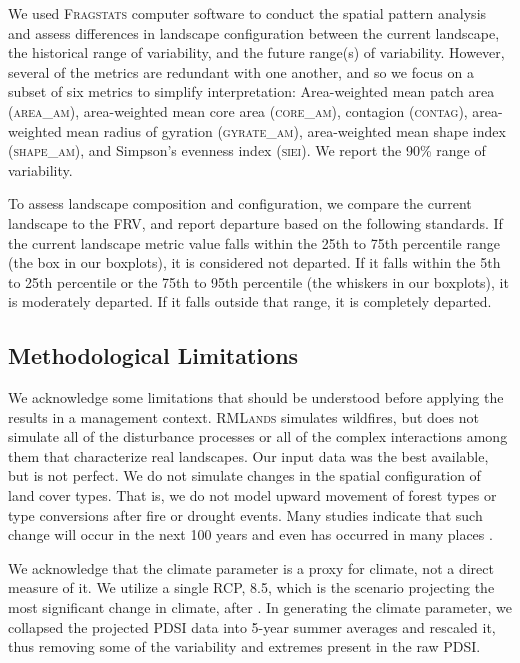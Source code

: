 \documentclass[12pt]{article}
\begin{document}
\begin{spacing}{1}
%
We used \textsc{Fragstats} computer software \citep{Fragstats2012} to conduct the spatial pattern analysis and assess differences in landscape configuration between the current landscape, the historical range of variability, and the future range(s) of variability. However, several of the metrics are redundant with one another, and so we focus on a subset of six metrics to simplify interpretation: Area-weighted mean patch area (\textsc{area\_am}), area-weighted mean core area (\textsc{core\_am}), contagion (\textsc{contag}), area-weighted mean radius of gyration (\textsc{gyrate\_am}), area-weighted mean shape index (\textsc{shape\_am}), and Simpson's evenness index (\textsc{siei}). We report the 90\% range of variability. %

To assess landscape composition and configuration, we compare the current landscape to the FRV, and report departure based on the following standards. If the current landscape metric value falls within the 25th to 75th percentile range (the box in our boxplots), it is considered not departed. If it falls within the 5th to 25th percentile or the 75th to 95th percentile (the whiskers in our boxplots), it is moderately departed. If it falls outside that range, it is completely departed.



\subsection*{Methodological Limitations}
We acknowledge some limitations that should be understood before applying the results in a management context. \textsc{RMLands} simulates wildfires, but does not simulate all of the disturbance processes or all of the complex interactions among them that characterize real landscapes. Our input data was the best available, but is not perfect. We do not simulate changes in the spatial configuration of land cover types. That is, we do not model upward movement of forest types or type conversions after fire or drought events. Many studies indicate that such change will occur in the next 100 years and even has occurred in many places \citep{Bachelet2001}. 

We acknowledge that the climate parameter is a proxy for climate, not a direct measure of it. We utilize a single RCP, 8.5, which is the scenario projecting the most significant change in climate, after \citet{Cook2014}. In generating the climate parameter, we collapsed the projected PDSI data into 5-year summer averages and rescaled it, thus removing some of the variability and extremes present in the raw PDSI.













\end{spacing}
\end{document}

